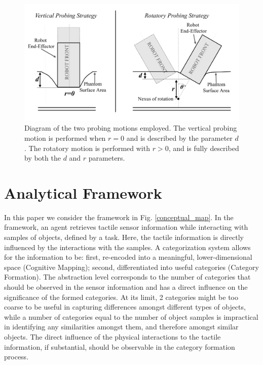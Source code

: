 \begin{figure}[]
	\centering
	\includegraphics[width=\columnwidth]{./figs/motion_diagram.pdf}
	\caption{Diagram of the two probing motions employed. The vertical probing motion is performed when $r=0$ and is described by the parameter $d$. The rotatory motion is performed with $r>0$, and is fully described by both the $d$ and $r$ parameters.}
	\label{probing}
\end{figure}


\section{Analytical Framework} \label{sec_th_framework}
In this paper we consider the framework in Fig. \ref{conceptual_map}. In the framework, an agent retrieves tactile sensor information while interacting with samples of objects, defined by a task. Here, the tactile information is directly influenced by the interactions with the samples. A categorization system allows for the information to be: first, re-encoded into a meaningful, lower-dimensional space (Cognitive Mapping); second, differentiated into useful categories (Category Formation). The abstraction level corresponds to the number of categories that should be observed in the sensor information and has a direct influence on the significance of the formed categories. 
At its limit, 2 categories might be too coarse to be useful in capturing differences amongst different types of objects, while a number of categories equal to the number of object samples is impractical in identifying any similarities amongst them, and therefore amongst similar objects. The direct influence of the physical interactions to the tactile information, if substantial, should be observable in the category formation process. 

